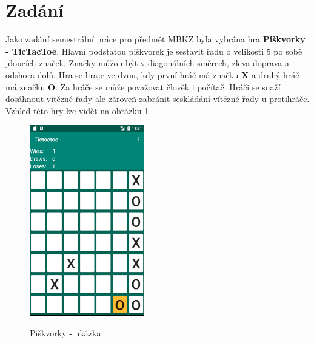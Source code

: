 \documentclass[12pt, a4paper]{article}
\begin{document}
\section{Zadání}
Jako zadání semestrální práce pro předmět MBKZ byla vybrána hra \textbf{Piškvorky - TicTacToe}. Hlavní podstatou piškvorek je sestavit řadu o velikosti 5 po sobě jdoucích značek. Značky můžou být v diagonálních směrech, zleva doprava a odshora dolů. Hra se hraje ve dvou, kdy první hráč má značku \textbf{X} a druhý hráč má značku \textbf{O}. Za hráče se může považovat člověk i počítač. Hráči se snaží dosáhnout vítězné řady ale zároveň zabránit seskládání vítězné řady u protihráče. Vzhled této hry lze vidět na obrázku \ref{fig:uvod_obrazek}.
	\begin{figure}[h!]
	\centering
	\includegraphics[width=5cm]{img/highlighted}\\
	\caption{Piškvorky - ukázka}
	\label{fig:uvod_obrazek}
	\end{figure}
\newpage
\end{document}
